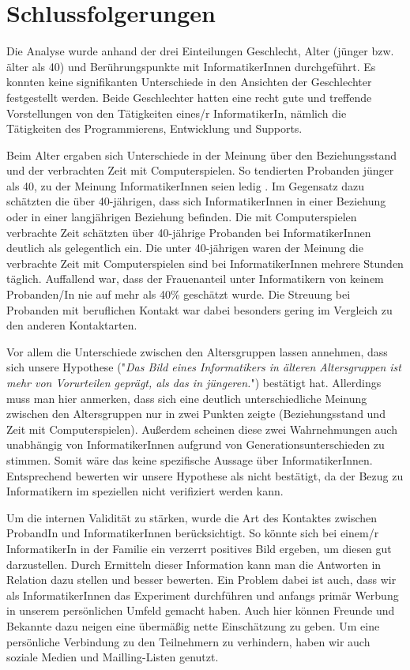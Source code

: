 \documentclass[de]{agse-empir-report}\usepackage[]{graphicx}\usepackage[]{color}
\begin{document}
\section[at]{Schlussfolgerungen}

Die Analyse wurde anhand der drei Einteilungen Geschlecht, Alter (jünger bzw. älter als 40) und Berührungspunkte mit InformatikerInnen durchgeführt. Es konnten keine signifikanten Unterschiede in den Ansichten der Geschlechter festgestellt werden. Beide Geschlechter hatten eine recht gute und treffende Vorstellungen von den Tätigkeiten eines/r InformatikerIn, nämlich die Tätigkeiten des Programmierens, Entwicklung und Supports.

Beim Alter ergaben sich Unterschiede in der Meinung über den Beziehungsstand und der verbrachten Zeit mit Computerspielen. So tendierten Probanden jünger als 40, zu der Meinung InformatikerInnen seien ledig . Im Gegensatz dazu schätzten die über 40-jährigen, dass sich InformatikerInnen in einer Beziehung oder in einer langjährigen Beziehung befinden. Die mit Computerspielen verbrachte Zeit schätzten über 40-jährige Probanden bei InformatikerInnen deutlich als gelegentlich ein. Die unter 40-jährigen waren der Meinung die verbrachte Zeit mit Computerspielen sind bei InformatikerInnen mehrere Stunden täglich. Auffallend war, dass der Frauenanteil unter Informatikern von keinem Probanden/In nie auf mehr als 40\% geschätzt wurde. Die Streuung bei Probanden mit beruflichen Kontakt war dabei besonders gering im Vergleich zu den anderen Kontaktarten. 

Vor allem die Unterschiede zwischen den Altersgruppen lassen annehmen, dass sich unsere Hypothese ("\textit{Das Bild eines Informatikers in älteren Altersgruppen ist mehr von Vorurteilen geprägt, als das in jüngeren.}") bestätigt hat. Allerdings muss man hier anmerken, dass sich eine deutlich unterschiedliche Meinung zwischen den Altersgruppen nur in zwei Punkten zeigte (Beziehungsstand und Zeit mit Computerspielen). Außerdem scheinen diese zwei Wahrnehmungen auch unabhängig von InformatikerInnen aufgrund von Generationsunterschieden zu stimmen. Somit wäre das keine spezifische Aussage über InformatikerInnen. Entsprechend bewerten wir unsere Hypothese als nicht bestätigt, da der Bezug zu Informatikern im speziellen nicht verifiziert werden kann.

Um die internen Validität zu stärken, wurde die Art des Kontaktes zwischen ProbandIn und InformatikerInnen berücksichtigt. So könnte sich bei einem/r InformatikerIn in der Familie ein verzerrt positives Bild ergeben, um diesen gut darzustellen. Durch Ermitteln dieser Information kann man die Antworten in Relation dazu stellen und besser bewerten. Ein Problem dabei ist auch, dass wir als InformatikerInnen das Experiment durchführen und anfangs primär Werbung in unserem persönlichen Umfeld gemacht haben. Auch hier können Freunde und Bekannte dazu neigen eine übermäßig nette Einschätzung zu geben. Um eine persönliche Verbindung zu den Teilnehmern zu verhindern, haben wir auch soziale Medien und Mailling-Listen genutzt. 
 
\end{document}
